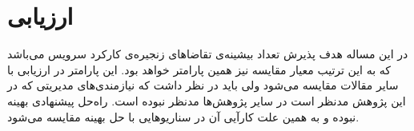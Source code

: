 
\chapter{ارزیابی}

در این مساله هدف پذیرش تعداد بیشینه‌ی تقاضاهای زنجیره‌ی کارکرد سرویس می‌باشد که به این ترتیب معیار مقایسه نیز همین پارامتر خواهد بود. این پارامتر در ارزیابی با سایر مقالات مقایسه می‌شود ولی باید در نظر داشت که نیازمندی‌های مدیریتی که در این پژوهش مدنظر است در سایر پژوهش‌ها مدنظر نبوده است.
راه‌حل پیشنهادی بهینه نبوده و به همین علت کارآیی آن در سناریوهایی با حل بهینه مقایسه می‌شود.